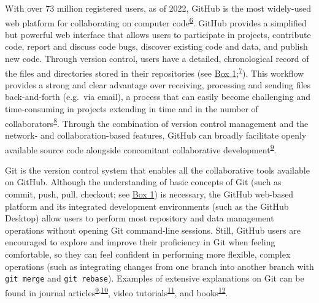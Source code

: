 With over 73 million registered users, as of 2022, GitHub is the most widely-used web platform for collaborating on computer code\textsuperscript{\protect\hyperlink{ref-nwCtHDCn}{6}}.
GitHub provides a simplified but powerful web interface that allows users to participate in projects, contribute code, report and discuss code bugs, discover existing code and data, and publish new code.
Through version control, users have a detailed, chronological record of the files and directories stored in their repositories (see \protect\hyperlink{definitions}{Box 1};\textsuperscript{\protect\hyperlink{ref-RVetqmsg}{7}}).
This workflow provides a strong and clear advantage over receiving, processing and sending files back-and-forth (e.g.~via email), a process that can easily become challenging and time-consuming in projects extending in time and in the number of collaborators\textsuperscript{\protect\hyperlink{ref-4ny1onB0}{8}}.
Through the combination of version control management and the network- and collaboration-based features, GitHub can broadly facilitate openly available source code alongside concomitant collaborative development\textsuperscript{\protect\hyperlink{ref-kEX5dgzK}{9}}.

Git is the version control system that enables all the collaborative tools available on GitHub.
Although the understanding of basic concepts of Git (such as commit, push, pull, checkout; see \protect\hyperlink{definitions}{Box 1}) is necessary, the GitHub web-based platform and its integrated development environments (such as the GitHub Desktop) allow users to perform most repository and data management operations without opening Git command-line sessions.
Still, GitHub users are encouraged to explore and improve their proficiency in Git when feeling comfortable, so they can feel confident in performing more flexible, complex operations (such as integrating changes from one branch into another branch with \texttt{git\ merge} and \texttt{git\ rebase}). Examples of extensive explanations on Git can be found in journal articles\textsuperscript{\protect\hyperlink{ref-kEX5dgzK}{9},\protect\hyperlink{ref-PlcxShQU}{10}}, video tutorials\textsuperscript{\protect\hyperlink{ref-NIS0JOW0}{11}}, and books\textsuperscript{\protect\hyperlink{ref-13jOlVcpp}{12}}.

